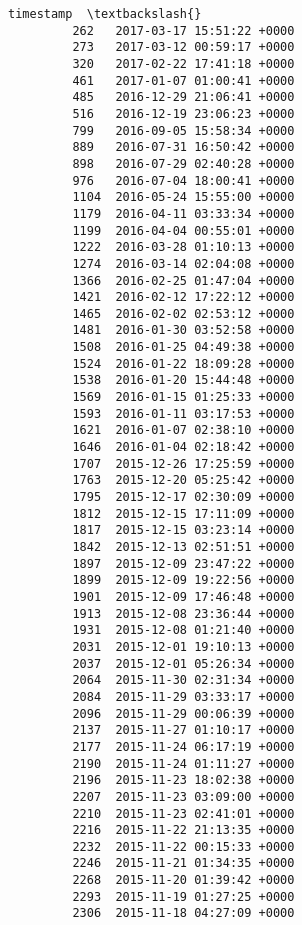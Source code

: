 \documentclass[11pt]{article}
\begin{document}
\begin{Verbatim}[commandchars=\\\{\}]
                               timestamp  \textbackslash{}
         262   2017-03-17 15:51:22 +0000   
         273   2017-03-12 00:59:17 +0000   
         320   2017-02-22 17:41:18 +0000   
         461   2017-01-07 01:00:41 +0000   
         485   2016-12-29 21:06:41 +0000   
         516   2016-12-19 23:06:23 +0000   
         799   2016-09-05 15:58:34 +0000   
         889   2016-07-31 16:50:42 +0000   
         898   2016-07-29 02:40:28 +0000   
         976   2016-07-04 18:00:41 +0000   
         1104  2016-05-24 15:55:00 +0000   
         1179  2016-04-11 03:33:34 +0000   
         1199  2016-04-04 00:55:01 +0000   
         1222  2016-03-28 01:10:13 +0000   
         1274  2016-03-14 02:04:08 +0000   
         1366  2016-02-25 01:47:04 +0000   
         1421  2016-02-12 17:22:12 +0000   
         1465  2016-02-02 02:53:12 +0000   
         1481  2016-01-30 03:52:58 +0000   
         1508  2016-01-25 04:49:38 +0000   
         1524  2016-01-22 18:09:28 +0000   
         1538  2016-01-20 15:44:48 +0000   
         1569  2016-01-15 01:25:33 +0000   
         1593  2016-01-11 03:17:53 +0000   
         1621  2016-01-07 02:38:10 +0000   
         1646  2016-01-04 02:18:42 +0000   
         1707  2015-12-26 17:25:59 +0000   
         1763  2015-12-20 05:25:42 +0000   
         1795  2015-12-17 02:30:09 +0000   
         1812  2015-12-15 17:11:09 +0000   
         1817  2015-12-15 03:23:14 +0000   
         1842  2015-12-13 02:51:51 +0000   
         1897  2015-12-09 23:47:22 +0000   
         1899  2015-12-09 19:22:56 +0000   
         1901  2015-12-09 17:46:48 +0000   
         1913  2015-12-08 23:36:44 +0000   
         1931  2015-12-08 01:21:40 +0000   
         2031  2015-12-01 19:10:13 +0000   
         2037  2015-12-01 05:26:34 +0000   
         2064  2015-11-30 02:31:34 +0000   
         2084  2015-11-29 03:33:17 +0000   
         2096  2015-11-29 00:06:39 +0000   
         2137  2015-11-27 01:10:17 +0000   
         2177  2015-11-24 06:17:19 +0000   
         2190  2015-11-24 01:11:27 +0000   
         2196  2015-11-23 18:02:38 +0000   
         2207  2015-11-23 03:09:00 +0000   
         2210  2015-11-23 02:41:01 +0000   
         2216  2015-11-22 21:13:35 +0000   
         2232  2015-11-22 00:15:33 +0000   
         2246  2015-11-21 01:34:35 +0000   
         2268  2015-11-20 01:39:42 +0000   
         2293  2015-11-19 01:27:25 +0000   
         2306  2015-11-18 04:27:09 +0000   
         

\end{Verbatim}
\end{document}
